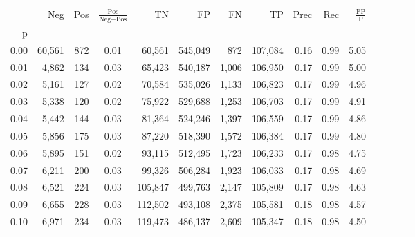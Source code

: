 \begin{tabular}{rrrcrrrrrrrrrrr}
\toprule
{} &     Neg &     Pos & $\frac{\text{Pos}}{\text{Neg}+\text{Pos}}$ &       TN &       FP &       FN &       TP &  Prec &   Rec & $\frac{\text{FP}}{\text{P}}$ \\
p    &         &         &                                            &          &          &          &          &       &       &                              \\
\midrule
0.00 &  60,561 &     872 &                                       0.01 &   60,561 &  545,049 &      872 &  107,084 &  0.16 &  0.99 &                         5.05 \\
0.01 &   4,862 &     134 &                                       0.03 &   65,423 &  540,187 &    1,006 &  106,950 &  0.17 &  0.99 &                         5.00 \\
0.02 &   5,161 &     127 &                                       0.02 &   70,584 &  535,026 &    1,133 &  106,823 &  0.17 &  0.99 &                         4.96 \\
0.03 &   5,338 &     120 &                                       0.02 &   75,922 &  529,688 &    1,253 &  106,703 &  0.17 &  0.99 &                         4.91 \\
0.04 &   5,442 &     144 &                                       0.03 &   81,364 &  524,246 &    1,397 &  106,559 &  0.17 &  0.99 &                         4.86 \\
0.05 &   5,856 &     175 &                                       0.03 &   87,220 &  518,390 &    1,572 &  106,384 &  0.17 &  0.99 &                         4.80 \\
0.06 &   5,895 &     151 &                                       0.02 &   93,115 &  512,495 &    1,723 &  106,233 &  0.17 &  0.98 &                         4.75 \\
0.07 &   6,211 &     200 &                                       0.03 &   99,326 &  506,284 &    1,923 &  106,033 &  0.17 &  0.98 &                         4.69 \\
0.08 &   6,521 &     224 &                                       0.03 &  105,847 &  499,763 &    2,147 &  105,809 &  0.17 &  0.98 &                         4.63 \\
0.09 &   6,655 &     228 &                                       0.03 &  112,502 &  493,108 &    2,375 &  105,581 &  0.18 &  0.98 &                         4.57 \\
0.10 &   6,971 &     234 &                                       0.03 &  119,473 &  486,137 &    2,609 &  105,347 &  0.18 &  0.98 &                         4.50 \\

\end{tabular}

